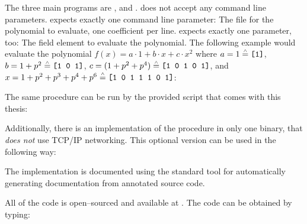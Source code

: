 %
%
\label{sec:usage}

The three main programs are \JWBpOne{}, \JWBpTwo{} and \JWBtoken{}. \JWBtoken{}
does not accept any command line parameters. \JWpOne{} expects exactly one
command line parameter: The file for the polynomial to evaluate, one coefficient
per line. \JWpTwo{} expects exactly one parameter, too: The field element to
evaluate the polynomial. The following example would evaluate the polynomial
$f(x) = a \cdot 1 + b \cdot x + c \cdot x^2$ where $a = 1 \stackrel{\scriptscriptstyle\wedge}{=}
\text{\texttt{[1]}}$, $b = 1 + p^2 \stackrel{\scriptscriptstyle\wedge}{=} \text{\texttt{[1 0 1]}}$,
$c = (1 + p^2 + p^4) \stackrel{\scriptscriptstyle\wedge}{=} \text{\texttt{[1 0 1 0 1]}}$, and $x = 1 + p^2
+ p^3 + p^4 + p^6 \stackrel{\scriptscriptstyle\wedge}{=} \text{\texttt{[1 0 1 1 1 0 1]}}$:

\medskip{}





\medskip{}

\noindent{}The same procedure can be run by the provided
 script that comes with this thesis:

\medskip{}


\medskip{}

\noindent{}Additionally, there is an implementation of the procedure in only one
binary, that \emph{does not} use TCP/IP networking. This optional version can be
used in the following way:

\medskip{}



%
%
\label{sec:implementation-doc}

The implementation is documented using \JWTLhaddock{} the standard tool for
automatically generating documentation from annotated \JWThaskell{} source code.



%
%
\label{sec:code-availability}

All of the code is open--sourced and available at
. The code can
be obtained by typing:



